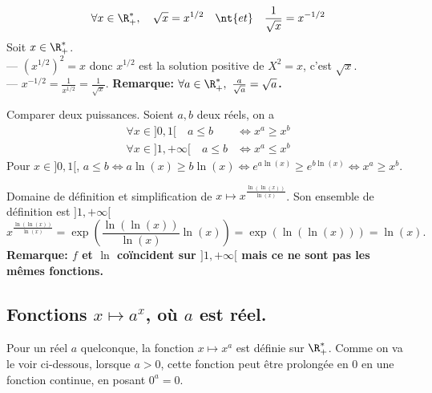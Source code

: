 \documentclass[11pt]{article}
\begin{document}
\begin{corr}{}{}
    \begin{equation*}
        \forall x\in\R^*_+,\quad\sqrt{x}=x^{1/2}\quad\nt{et}\quad\frac{1}{\sqrt{x}}=x^{-1/2}
    \end{equation*}
    \tcblower
    Soit $x\in\R_+^*$.\\
    --- $(x^{1/2})^2=x$ donc $x^{1/2}$ est la solution positive de $X^2=x$, c'est $\sqrt{x}$.\\
    --- $x^{-1/2}=\frac{1}{x^{1/2}}=\frac{1}{\sqrt{x}}$.\n
    \bf{Remarque:} $\forall a\in\R_+^*,~\frac{a}{\sqrt{a}}=\sqrt{a}$.
\end{corr}

\begin{prop}{Comparer deux puissances.}{}
    Soient $a,b$ deux réels, on a
    \begin{align*}
        \forall x\in]0,1[\quad a\leq b&\iff x^a\geq x^b\\
        \forall x\in]1,+\infty[\quad a\leq b &\iff x^a \leq x^b
    \end{align*}
    \tcblower
    Pour $x\in]0,1[$, $a\leq b\iff a\ln(x) \geq b\ln(x)\iff e^{a\ln(x)}\geq e^{b\ln(x)}\iff x^a\geq x^b$.
\end{prop}

\begin{ex}{}{}
    Domaine de définition et simplification de $x\mapsto x^{\frac{\ln(\ln(x))}{\ln(x)}}$.
    \tcblower
    Son ensemble de définition est $]1,+\infty[$
    \begin{equation*}
        x^{\frac{\ln(\ln(x))}{\ln(x)}}=\exp\left( \frac{\ln(\ln(x))}{\ln(x)} \ln(x)\right)=\exp(\ln(\ln(x)))=\ln(x).
    \end{equation*}
    \bf{Remarque:} $f$ et $\ln$ coïncident sur $]1,+\infty[$ mais ce ne sont pas les mêmes fonctions. 
\end{ex}

\subsection{Fonctions \texorpdfstring{$x\mapsto a^x$}{Lg}, où \texorpdfstring{$a$}{Lg} est réel.}

\begin{defi}{}{}
    Pour un réel $a$ quelconque, la fonction $x\mapsto x^a$ est définie sur $\R_+^*$.\n
    Comme on va le voir ci-dessous, lorsque $a>0$, cette fonction peut être prolongée en 0 en une fonction continue, en posant $0^a=0$.
\end{defi}
\end{document}
